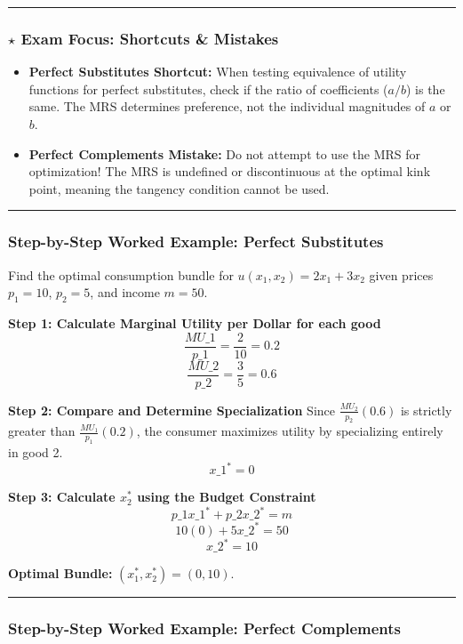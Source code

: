 \documentclass{article}
\begin{document}
\medskip\noindent\rule{\linewidth}{0.4pt}\medskip

\subsubsection*{$\star$ Exam Focus: Shortcuts \& Mistakes}
\begin{itemize}
    \item \textbf{Perfect Substitutes Shortcut:} When testing equivalence of utility functions for perfect substitutes, check if the ratio of coefficients ($a/b$) is the same. The MRS determines preference, not the individual magnitudes of $a$ or $b$.
    \item \textbf{Perfect Complements Mistake:} Do not attempt to use the MRS for optimization! The MRS is undefined or discontinuous at the optimal kink point, meaning the tangency condition cannot be used.
\end{itemize}

\medskip\noindent\rule{\linewidth}{0.4pt}\medskip

\subsubsection*{Step-by-Step Worked Example: Perfect Substitutes}

Find the optimal consumption bundle for $u(x_1, x_2) = 2x_1 + 3x_2$ given prices $p_1=10$, $p_2=5$, and income $m=50$.

\textbf{Step 1: Calculate Marginal Utility per Dollar for each good}
\[ \frac{MU\_1}{p\_1} = \frac{2}{10} = 0.2 \]
\[ \frac{MU\_2}{p\_2} = \frac{3}{5} = 0.6 \]

\textbf{Step 2: Compare and Determine Specialization}
Since $\frac{MU_2}{p_2} (0.6)$ is strictly greater than $\frac{MU_1}{p_1} (0.2)$, the consumer maximizes utility by specializing entirely in good 2.
\[ x\_1^* = 0 \]

\textbf{Step 3: Calculate $x_2^*$ using the Budget Constraint}
\[ p\_1 x\_1^* + p\_2 x\_2^* = m \]
\[ 10(0) + 5x\_2^* = 50 \]
\[ x\_2^* = 10 \]

\textbf{Optimal Bundle:} $(x_1^*, x_2^*) = (0, 10)$.

\medskip\noindent\rule{\linewidth}{0.4pt}\medskip

\subsubsection*{Step-by-Step Worked Example: Perfect Complements}
\end{document}
